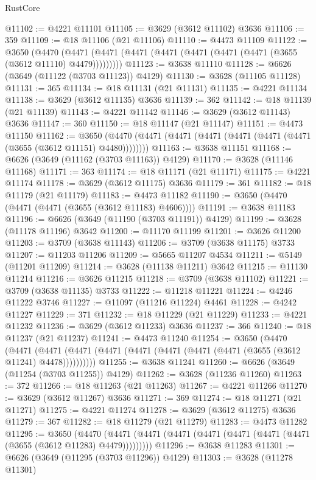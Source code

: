 \begin{lexlean}{RustCore}
\begin{coremodule}
@11102 := @4221 @11101
@11105 := @3629 (@3612 @11102) @3636
@11106 := 359
@11109 := @18 @11106 (@21 @11106)
@11110 := @4473 @11109
@11122 := @3650
    (@4470 (@4471 (@4471 (@4471 (@4471 (@4471 (@4471 (@4471 (@3655 (@3612 @11110) @4479)))))))))
@11123 := @3638 @11110
@11128 := @6626 (@3649 (@11122 (@3703 @11123)) @4129)
@11130 := @3628 (@11105 @11128)
@11131 := 365
@11134 := @18 @11131 (@21 @11131)
@11135 := @4221 @11134
@11138 := @3629 (@3612 @11135) @3636
@11139 := 362
@11142 := @18 @11139 (@21 @11139)
@11143 := @4221 @11142
@11146 := @3629 (@3612 @11143) @3636
@11147 := 360
@11150 := @18 @11147 (@21 @11147)
@11151 := @4473 @11150
@11162 := @3650 (@4470 (@4471 (@4471 (@4471 (@4471 (@4471 (@4471 (@3655 (@3612 @11151) @4480))))))))
@11163 := @3638 @11151
@11168 := @6626 (@3649 (@11162 (@3703 @11163)) @4129)
@11170 := @3628 (@11146 @11168)
@11171 := 363
@11174 := @18 @11171 (@21 @11171)
@11175 := @4221 @11174
@11178 := @3629 (@3612 @11175) @3636
@11179 := 361
@11182 := @18 @11179 (@21 @11179)
@11183 := @4473 @11182
@11190 := @3650 (@4470 (@4471 (@4471 (@3655 (@3612 @11183) @4606))))
@11191 := @3638 @11183
@11196 := @6626 (@3649 (@11190 (@3703 @11191)) @4129)
@11199 := @3628 (@11178 @11196) @3642
@11200 := @11170 @11199
@11201 := @3626 @11200
@11203 := @3709 (@3638 @11143)
@11206 := @3709 (@3638 @11175) @3733
@11207 := @11203 @11206
@11209 := @5665 @11207 @4534
@11211 := @5149 (@11201 @11209)
@11214 := @3628 (@11138 @11211) @3642
@11215 := @11130 @11214
@11216 := @3626 @11215
@11218 := @3709 (@3638 @11102)
@11221 := @3709 (@3638 @11135) @3733
@11222 := @11218 @11221
@11224 := @4246 @11222 @3746
@11227 := @11097 (@11216 @11224) @4461
@11228 := @4242 @11227
@11229 := 371
@11232 := @18 @11229 (@21 @11229)
@11233 := @4221 @11232
@11236 := @3629 (@3612 @11233) @3636
@11237 := 366
@11240 := @18 @11237 (@21 @11237)
@11241 := @4473 @11240
@11254 := @3650
    (@4470
      (@4471 (@4471 (@4471 (@4471 (@4471 (@4471 (@4471 (@4471 (@3655 (@3612 @11241) @4478))))))))))
@11255 := @3638 @11241
@11260 := @6626 (@3649 (@11254 (@3703 @11255)) @4129)
@11262 := @3628 (@11236 @11260)
@11263 := 372
@11266 := @18 @11263 (@21 @11263)
@11267 := @4221 @11266
@11270 := @3629 (@3612 @11267) @3636
@11271 := 369
@11274 := @18 @11271 (@21 @11271)
@11275 := @4221 @11274
@11278 := @3629 (@3612 @11275) @3636
@11279 := 367
@11282 := @18 @11279 (@21 @11279)
@11283 := @4473 @11282
@11295 := @3650
    (@4470 (@4471 (@4471 (@4471 (@4471 (@4471 (@4471 (@4471 (@3655 (@3612 @11283) @4479)))))))))
@11296 := @3638 @11283
@11301 := @6626 (@3649 (@11295 (@3703 @11296)) @4129)
@11303 := @3628 (@11278 @11301)

\end{coremodule}
\end{lexlean}
